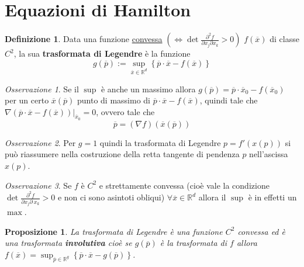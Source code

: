 \documentclass{book}
\theoremstyle{plain}
\theoremstyle{plain}
\theoremstyle{plain}
\theoremstyle{plain}
\theoremstyle{plain}
\newtheorem{prop}{Proposizione}[chapter]
\theoremstyle{definition}
\newtheorem{defi}{Definizione}[chapter]
\theoremstyle{remark}
\newtheorem*{oss}{Osservazione}
\theoremstyle{definition}
\begin{document}
\section{Equazioni di Hamilton}

\begin{defi}
    Data una funzione \underline{convessa} $\left(\iff \det\frac{\partial^2f}{\partial x_j\partial x_k}>0\right)$ $f(\overline{x})$ di classe $C^2$, la sua \textbf{trasformata di Legendre} è la funzione
    \begin{displaymath}
        \boxed{
        g(\overline{p}):=\sup_{\overline{x}\in\mathbb{R}^d} \left\{\overline{p}\cdot\overline{x}-f(\overline{x})\right\}
        }
    \end{displaymath}
\end{defi}

\begin{oss}
    Se il $\sup$ è anche un massimo allora $g(\overline{p})=\overline{p}\cdot\overline{x}_0-f(\overline{x}_0)$ per un certo $\overline{x}(\overline{p})$ punto di massimo di $\overline{p}\cdot\overline{x}-f(\overline{x})$, quindi tale che $\nabla(\overline{p}\cdot\overline{x}-f(\overline{x}))|_{\overline{x}_0}=0$, ovvero tale che
    \begin{displaymath}
        \overline{p}=(\nabla f)\left(\overline{x}(\overline{p})\right)
    \end{displaymath}
\end{oss}

\begin{oss}
    Per $g=1$ quindi la trasformata di Legendre $p=f'(x(p))$ si può riassumere nella costruzione della retta tangente di pendenza $p$ nell'ascissa $x(p)$.
\end{oss}

\begin{oss}
     Se $f$ è $C^2$ e strettamente convessa (cioè vale la condizione $\det\frac{\partial^2f}{\partial x_j\partial\ x_k}>0$ e non ci sono asintoti obliqui) $\forall \overline{x}\in\mathbb{R}^d$ allora il $\sup$ è in effetti un $\max$.
\end{oss}

\begin{prop}
\everymath{\displaystyle}
     La trasformata di Legendre è una funzione $C^2$ convessa ed è una trasformata \textbf{involutiva} cioè se $g(\overline{p})$ è la trasformata di $f$ allora $f(\overline{x})=\sup_{\overline{p}\in\mathbb{R}^g}\left\{\overline{p}\cdot\overline{x}-g(\overline{p})\right\}$.
\end{prop}
\end{document}
